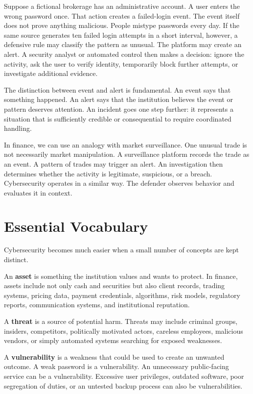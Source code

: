 Suppose a fictional brokerage has an administrative account. A user enters the wrong password once. That action creates a failed-login event. The event itself does not prove anything malicious. People mistype passwords every day. If the same source generates ten failed login attempts in a short interval, however, a defensive rule may classify the pattern as unusual. The platform may create an alert. A security analyst or automated control then makes a decision: ignore the activity, ask the user to verify identity, temporarily block further attempts, or investigate additional evidence.

The distinction between event and alert is fundamental. An event says that something happened. An alert says that the institution believes the event or pattern deserves attention. An incident goes one step further: it represents a situation that is sufficiently credible or consequential to require coordinated handling.

In finance, we can use an analogy with market surveillance. One unusual trade is not necessarily market manipulation. A surveillance platform records the trade as an event. A pattern of trades may trigger an alert. An investigation then determines whether the activity is legitimate, suspicious, or a breach. Cybersecurity operates in a similar way. The defender observes behavior and evaluates it in context.

\section{Essential Vocabulary}

Cybersecurity becomes much easier when a small number of concepts are kept distinct.

An \textbf{asset} is something the institution values and wants to protect. In finance, assets include not only cash and securities but also client records, trading systems, pricing data, payment credentials, algorithms, risk models, regulatory reports, communication systems, and institutional reputation.

A \textbf{threat} is a source of potential harm. Threats may include criminal groups, insiders, competitors, politically motivated actors, careless employees, malicious vendors, or simply automated systems searching for exposed weaknesses.

A \textbf{vulnerability} is a weakness that could be used to create an unwanted outcome. A weak password is a vulnerability. An unnecessary public-facing service can be a vulnerability. Excessive user privileges, outdated software, poor segregation of duties, or an untested backup process can also be vulnerabilities.

